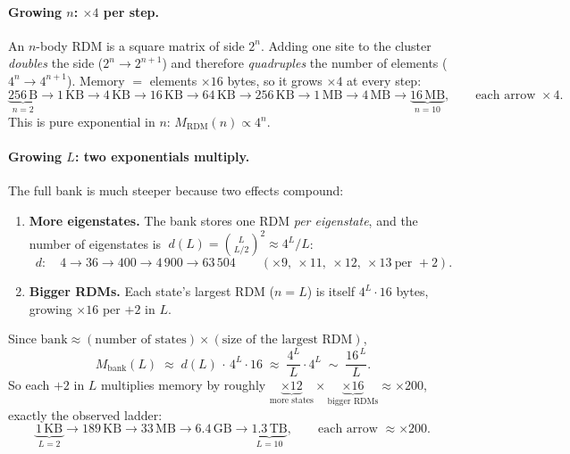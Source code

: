 \documentclass[11pt]{article}
\begin{document}
\paragraph{Growing $n$: $\times4$ per step.}
An $n$-body RDM is a square matrix of side $2^{n}$. Adding one site to the
cluster \emph{doubles} the side ($2^{n}\!\to\!2^{n+1}$) and therefore
\emph{quadruples} the number of elements ($4^{n}\!\to\!4^{n+1}$). Memory
$=$ elements $\times16$ bytes, so it grows $\times4$ at every step:
\[
  \underbrace{256\,\text{B}}_{n=2}\!\to 1\,\text{KB}\!\to 4\,\text{KB}\!\to
  16\,\text{KB}\!\to 64\,\text{KB}\!\to 256\,\text{KB}\!\to 1\,\text{MB}\!\to
  4\,\text{MB}\!\to\underbrace{16\,\text{MB}}_{n=10},
  \qquad \text{each arrow } \times4 .
\]
This is pure exponential in $n$: $M_{\mathrm{RDM}}(n)\propto 4^{n}$.

\paragraph{Growing $L$: two exponentials multiply.}
The full bank is much steeper because two effects compound:
\begin{enumerate}[nosep]
  \item \textbf{More eigenstates.} The bank stores one RDM \emph{per eigenstate},
        and the number of eigenstates is
        $\;d(L)=\binom{L}{L/2}^{2}\approx 4^{L}/L$:
        \[
          d:\quad 4 \to 36 \to 400 \to 4\,900 \to 63\,504
          \qquad(\times9,\ \times11,\ \times12,\ \times13\ \text{per }{+}2).
        \]
  \item \textbf{Bigger RDMs.} Each state's largest RDM ($n{=}L$) is itself
        $4^{L}\cdot16$ bytes, growing $\times16$ per ${+}2$ in $L$.
\end{enumerate}
Since $\text{bank}\approx(\text{number of states})\times(\text{size of the largest RDM})$,
\[
  M_{\mathrm{bank}}(L)\;\approx\; d(L)\,\cdot\,4^{L}\cdot 16
  \;\approx\;\frac{4^{L}}{L}\cdot 4^{L}\;\sim\;\frac{16^{\,L}}{L}.
\]
So each ${+}2$ in $L$ multiplies memory by roughly
$\underbrace{\times12}_{\text{more states}}\times\underbrace{\times16}_{\text{bigger RDMs}}\approx\times200$,
exactly the observed ladder:
\[
  \underbrace{1\,\text{KB}}_{L=2}\!\to 189\,\text{KB}\!\to 33\,\text{MB}\!\to
  6.4\,\text{GB}\!\to\underbrace{1.3\,\text{TB}}_{L=10},
  \qquad \text{each arrow } \approx\times200 .
\]
\end{document}
